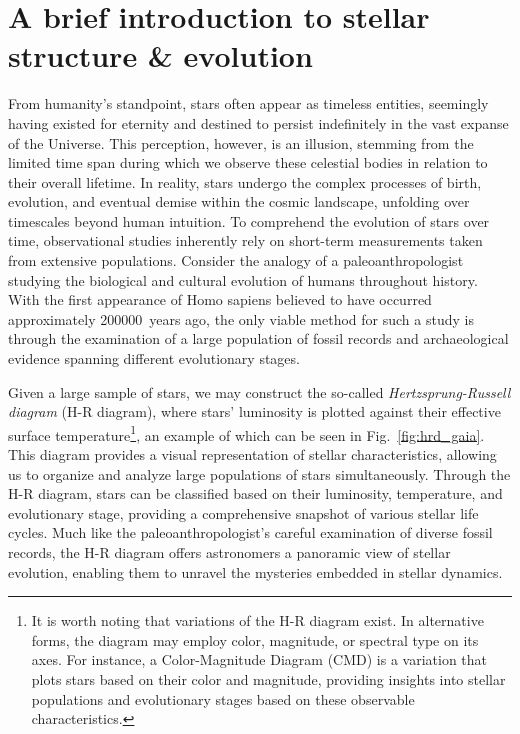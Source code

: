 \documentclass[main.tex]{subfiles}
\begin{document}
    
    {
    \adjustmtc
    \minitoc
    \newpage
    }
    
    
    
    \section{A brief introduction to stellar structure \& evolution}\label{sec:ch1:intro}
    From humanity's standpoint, stars often appear as timeless entities, seemingly having existed for eternity and destined to persist indefinitely in the vast expanse of the Universe. This perception, however, is an illusion, stemming from the limited time span during which we observe these celestial bodies in relation to their overall lifetime. In reality, stars undergo the complex processes of birth, evolution, and eventual demise within the cosmic landscape, unfolding over timescales beyond human intuition. To comprehend the evolution of stars over time, observational studies inherently rely on short-term measurements taken from extensive populations.
    Consider the analogy of a paleoanthropologist studying the biological and cultural evolution of humans throughout history. With the first appearance of Homo sapiens believed to have occurred approximately \SI{200000}{years} ago, the only viable method for such a study is through the examination of a large population of fossil records and archaeological evidence spanning different evolutionary stages.

    Given a large sample of stars, we may construct the so-called \textit{Hertzsprung-Russell diagram} (H-R diagram), where stars' luminosity is plotted against their effective surface temperature\footnote{It is worth noting that variations of the H-R diagram exist. In alternative forms, the diagram may employ color, magnitude, or spectral type on its axes. For instance, a Color-Magnitude Diagram (CMD) is a variation that plots stars based on their color and magnitude, providing insights into stellar populations and evolutionary stages based on these observable characteristics.}, an example of which can be seen in Fig.~\ref{fig:hrd_gaia}. This diagram provides a visual representation of stellar characteristics, allowing us to organize and analyze large populations of stars simultaneously. Through the H-R diagram, stars can be classified based on their luminosity, temperature, and evolutionary stage, providing a comprehensive snapshot of various stellar life cycles. Much like the paleoanthropologist's careful examination of diverse fossil records, the H-R diagram offers astronomers a panoramic view of stellar evolution, enabling them to unravel the mysteries embedded in stellar dynamics.
\end{document}
